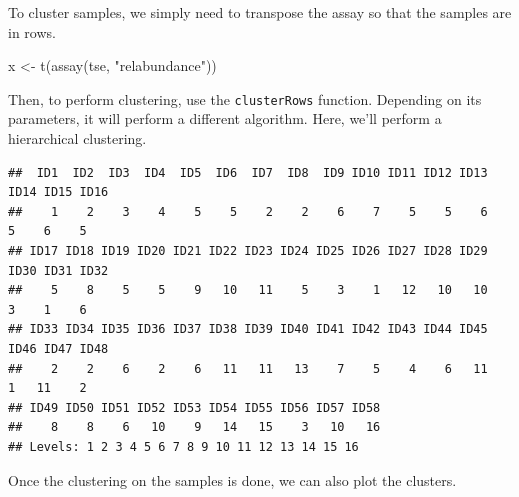 \documentclass[
]{book}
\newenvironment{Shaded}{\begin{snugshade}}{\end{snugshade}}
\newcommand{\CommentTok}[1]{\textcolor[rgb]{0.56,0.35,0.01}{\textit{#1}}}
\newcommand{\FunctionTok}[1]{\textcolor[rgb]{0.00,0.00,0.00}{#1}}
\newcommand{\NormalTok}[1]{#1}
\newcommand{\OtherTok}[1]{\textcolor[rgb]{0.56,0.35,0.01}{#1}}
\newcommand{\SpecialCharTok}[1]{\textcolor[rgb]{0.00,0.00,0.00}{#1}}
\newcommand{\StringTok}[1]{\textcolor[rgb]{0.31,0.60,0.02}{#1}}
\begin{document}
To cluster samples, we simply need to transpose the assay so that
the samples are in rows.

\begin{Shaded}
\begin{Highlighting}[]
\NormalTok{x }\OtherTok{\textless{}{-}} \FunctionTok{t}\NormalTok{(}\FunctionTok{assay}\NormalTok{(tse, }\StringTok{"relabundance"}\NormalTok{))}
\end{Highlighting}
\end{Shaded}

Then, to perform clustering, use the \texttt{clusterRows} function. Depending
on its parameters, it will perform a different algorithm. Here, we'll
perform a hierarchical clustering.

\begin{Shaded}
\end{Shaded}

\begin{verbatim}
##  ID1  ID2  ID3  ID4  ID5  ID6  ID7  ID8  ID9 ID10 ID11 ID12 ID13 ID14 ID15 ID16 
##    1    2    3    4    5    5    2    2    6    7    5    5    6    5    6    5 
## ID17 ID18 ID19 ID20 ID21 ID22 ID23 ID24 ID25 ID26 ID27 ID28 ID29 ID30 ID31 ID32 
##    5    8    5    5    9   10   11    5    3    1   12   10   10    3    1    6 
## ID33 ID34 ID35 ID36 ID37 ID38 ID39 ID40 ID41 ID42 ID43 ID44 ID45 ID46 ID47 ID48 
##    2    2    6    2    6   11   11   13    7    5    4    6   11    1   11    2 
## ID49 ID50 ID51 ID52 ID53 ID54 ID55 ID56 ID57 ID58 
##    8    8    6   10    9   14   15    3   10   16 
## Levels: 1 2 3 4 5 6 7 8 9 10 11 12 13 14 15 16
\end{verbatim}

Once the clustering on the samples is done, we can also plot the clusters.
\end{document}
